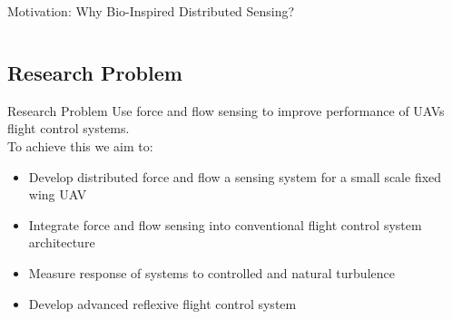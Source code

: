 \documentclass[aspectratio=169]{beamer}            %
\begin{document}
\begin{frame}{Motivation: Why Bio-Inspired Distributed Sensing?}
\begin{columns}
\begin{column}{0.5\textwidth}
{\begin{itemize}
	\end{itemize}
      }
    \end{column}
  \end{columns}
  
\end{frame}

\subsection{Research Problem}
\begin{frame}{Research Problem}
  Use force and flow sensing to improve performance of UAVs flight control systems.\\
  \pause
  To achieve this we aim to:
  \begin{itemize}
    \item<3-> Develop distributed force and flow a sensing system for a small scale fixed wing UAV
    \item<4-> Integrate force and flow sensing into conventional flight control system architecture
    \item<5-> Measure response of systems to controlled and natural turbulence
    \item<6-> Develop advanced reflexive flight control system
  \end{itemize}
\end{frame}
\end{document}

